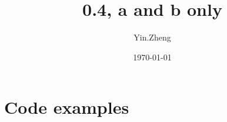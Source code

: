 \documentclass{article}
\title{0.4, a and b only}
\date{\today}
\author{Yin.Zheng}
\begin{document}
\maketitle

\section{Code examples}





\end{document}
